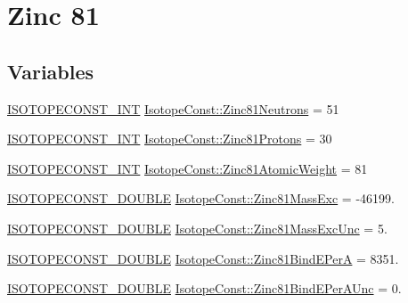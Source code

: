 \hypertarget{group___isotope_const-_zinc-_zn81}{}\section{Zinc 81}
\label{group___isotope_const-_zinc-_zn81}
\subsection*{Variables}
\begin{DoxyCompactItemize}
\item 
\mbox{\hyperlink{group___isotope_const-_macros_ga5f18360b3e99483a35c32d789e62621c}{I\+S\+O\+T\+O\+P\+E\+C\+O\+N\+S\+T\+\_\+\+I\+NT}} \mbox{\hyperlink{group___isotope_const-_zinc-_zn81_ga1c6ba9c6c97e793de2823c8c44f0f5b6}{Isotope\+Const\+::\+Zinc81\+Neutrons}} = 51
\item 
\mbox{\hyperlink{group___isotope_const-_macros_ga5f18360b3e99483a35c32d789e62621c}{I\+S\+O\+T\+O\+P\+E\+C\+O\+N\+S\+T\+\_\+\+I\+NT}} \mbox{\hyperlink{group___isotope_const-_zinc-_zn81_ga5b841cf8e40a82777e92e7438ec37a4c}{Isotope\+Const\+::\+Zinc81\+Protons}} = 30
\item 
\mbox{\hyperlink{group___isotope_const-_macros_ga5f18360b3e99483a35c32d789e62621c}{I\+S\+O\+T\+O\+P\+E\+C\+O\+N\+S\+T\+\_\+\+I\+NT}} \mbox{\hyperlink{group___isotope_const-_zinc-_zn81_gab380c8499bc1c6e14a3215f48f0e9f1e}{Isotope\+Const\+::\+Zinc81\+Atomic\+Weight}} = 81
\item 
\mbox{\hyperlink{group___isotope_const-_macros_ga8f45a7272ce02c0b4c65c44636ed719a}{I\+S\+O\+T\+O\+P\+E\+C\+O\+N\+S\+T\+\_\+\+D\+O\+U\+B\+LE}} \mbox{\hyperlink{group___isotope_const-_zinc-_zn81_ga33813c9f4c0bafb7fbde186f64959591}{Isotope\+Const\+::\+Zinc81\+Mass\+Exc}} = -\/46199.
\item 
\mbox{\hyperlink{group___isotope_const-_macros_ga8f45a7272ce02c0b4c65c44636ed719a}{I\+S\+O\+T\+O\+P\+E\+C\+O\+N\+S\+T\+\_\+\+D\+O\+U\+B\+LE}} \mbox{\hyperlink{group___isotope_const-_zinc-_zn81_ga0fc68955515a4962e7640da482710b6f}{Isotope\+Const\+::\+Zinc81\+Mass\+Exc\+Unc}} = 5.
\item 
\mbox{\hyperlink{group___isotope_const-_macros_ga8f45a7272ce02c0b4c65c44636ed719a}{I\+S\+O\+T\+O\+P\+E\+C\+O\+N\+S\+T\+\_\+\+D\+O\+U\+B\+LE}} \mbox{\hyperlink{group___isotope_const-_zinc-_zn81_gad9632b1cc2eab13af997ead6ff457972}{Isotope\+Const\+::\+Zinc81\+Bind\+E\+PerA}} = 8351.
\item 
\mbox{\hyperlink{group___isotope_const-_macros_ga8f45a7272ce02c0b4c65c44636ed719a}{I\+S\+O\+T\+O\+P\+E\+C\+O\+N\+S\+T\+\_\+\+D\+O\+U\+B\+LE}} \mbox{\hyperlink{group___isotope_const-_zinc-_zn81_gacedcbd2d77fed0d9c42449cbad42d650}{Isotope\+Const\+::\+Zinc81\+Bind\+E\+Per\+A\+Unc}} = 0.

\end{DoxyCompactItemize}
